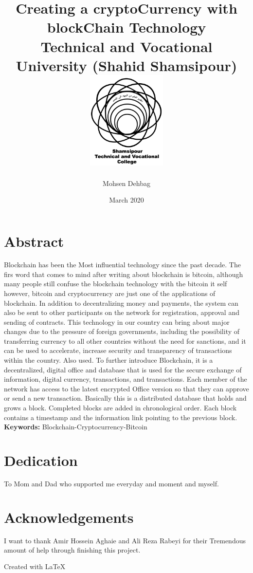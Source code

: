 \documentclass[12pt,twoside]{report}
\title{
{Creating a cryptoCurrency with blockChain Technology}\\
{\large Technical and Vocational University (Shahid Shamsipour)}\\
{\includegraphics[width=150px]{image/shamsi.png}}
}
\author{Mohsen Dehbag\\ \email{mohsendehbag@icloud.com}}
\date{March 2020}
\begin{document}
\maketitle


\chapter*{Abstract}

Blockchain  has been the Most influential  technology since the past decade. The firs word that comes to mind after writing about blockchain is bitcoin, although many people still confuse the blockchain technology with the bitcoin it self however, bitcoin and cryptocurrency are just one of the applications  of blockchain.  In addition to decentralizing money and payments, the system can also be sent to other participants on the network for registration, approval and sending of contracts. This technology in our country can bring about major changes due to the pressure of foreign governments, including the possibility of transferring currency to all other countries without the need for sanctions, and it can be used to accelerate, increase security and transparency of transactions within the country. Also used.
To further introduce Blockchain, it is a decentralized, digital office and database that is used for the secure exchange of information, digital currency, transactions, and transactions. Each member of the network has access to the latest encrypted Office version so that they can approve or send a new transaction. Basically this is a distributed database that holds and grows a block. Completed blocks are added in chronological order. Each block contains a timestamp and the information link pointing to the previous block.\\
\textbf{Keywords:} Blockchain-Cryptocurrency-Bitcoin

\chapter*{Dedication}
To Mom and Dad who supported me everyday and moment and myself.

\chapter*{Acknowledgements}
I want to thank Amir Hossein Aghaie and Ali Reza Rabeyi for their Tremendous amount of help through finishing this project.


\newpage
\Large Created with \LaTeX{}
\tableofcontents
\end{document}
